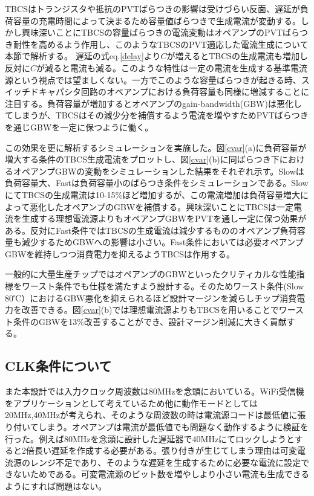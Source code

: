 \documentclass[letterpaper, 10 pt, conference]{ieeeconf}  %
\begin{document}
TBCSはトランジスタや抵抗のPVTばらつきの影響は受けづらい反面、遅延が負荷容量の充電時間によって決まるため容量値ばらつきで生成電流が変動する。しかし興味深いことにTBCSの容量ばらつきの電流変動はオペアンプのPVTばらつき耐性を高めるよう作用し、このようなTBCSのPVT適応した電流生成について本節で解析する。
遅延の式eq.\ref{delay}より$C$が増えるとTBCSの生成電流も増加し反対に$C$が減ると電流も減る。このような特性は一定の電流を生成する基準電流源という視点では望ましくない。一方でこのような容量ばらつきが起きる時、スイッチドキャパシタ回路のオペアンプにおける負荷容量も同様に増減することに注目する。負荷容量が増加するとオペアンプのgain-bandwidth(GBW)は悪化してしまうが、TBCSはその減少分を補償するよう電流を増やすためPVTばらつきを通じGBWを一定に保つように働く。

この効果を更に解析するシミュレーションを実施した。図\ref{cvar}(a)に負荷容量が増大する条件のTBCS生成電流をプロットし、図\ref{cvar}(b)に同ばらつき下におけるオペアンプGBWの変動をシミュレーションした結果をそれぞれ示す。Slowは負荷容量大、Fastは負荷容量小のばらつき条件をシミュレーションである。SlowにてTBCSの生成電流は10-15\%ほど増加するが、この電流増加は負荷容量増大によって悪化したオペアンプのGBWを補償する。興味深いことにTBCSは一定電流を生成する理想電流源よりもオペアンプGBWをPVTを通し一定に保つ効果がある。反対にFast条件ではTBCSの生成電流は減少するもののオペアンプ負荷容量も減少するためGBWへの影響は小さい。Fast条件においては必要オペアンプGBWを維持しつつ消費電力を抑えるようTBCSは作用する。

一般的に大量生産チップではオペアンプのGBWといったクリティカルな性能指標をワースト条件でも仕様を満たすよう設計する。そのためワースト条件(Slow 80℃）におけるGBW悪化を抑えられるほど設計マージンを減らしチップ消費電力を改善できる。図\ref{cvar}(b)では理想電流源よりもTBCSを用いることでワースト条件のGBWを13\%改善することができ、設計マージン削減に大きく貢献する。

\subsection{CLK条件について}
また本設計では入力クロック周波数は80MHzを念頭においている。WiFi受信機をアプリケーションとして考えているため他に動作モードとしては20MHz,40MHzが考えられ、そのような周波数の時は電流源コードは最低値に張り付いてしまう。オペアンプは電流が最低値でも問題なく動作するように検証を行った。例えば80MHzを念頭に設計した遅延器で40MHzにてロックしようとすると2倍長い遅延を作成する必要がある。張り付きが生じてしまう理由は可変電流源のレンジ不足であり、そのような遅延を生成するために必要な電流に設定できないためである。可変電流源のビット数を増やしより小さい電流も生成できるようにすれば問題はない。
\end{document}
